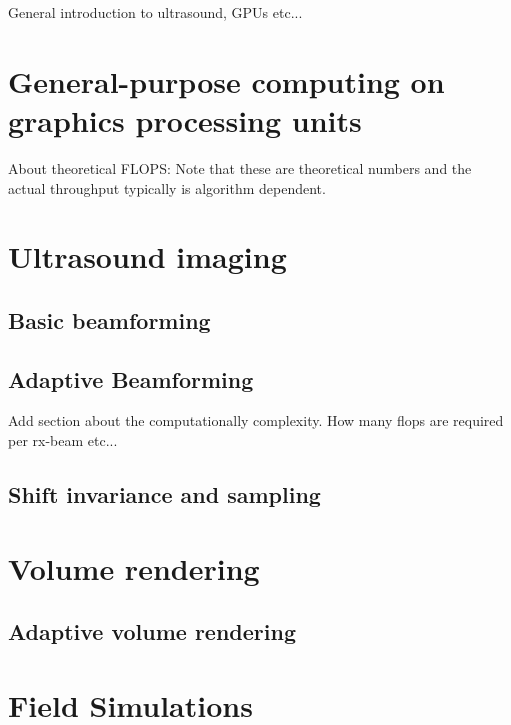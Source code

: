 %

General introduction to ultrasound, GPUs etc...

\section{General-purpose computing on graphics processing units}

About theoretical FLOPS: Note that these are theoretical numbers and the actual throughput typically is algorithm dependent.

\section {Ultrasound imaging}
							
\subsection{Basic beamforming}

\subsection{Adaptive Beamforming}\label{sec:adaptbf}

Add section about the computationally complexity. How many flops are required per rx-beam etc...
						
\subsection{Shift invariance and sampling}

\section{Volume rendering}

\subsection{Adaptive volume rendering}

\section{Field Simulations}
			
\endinput
